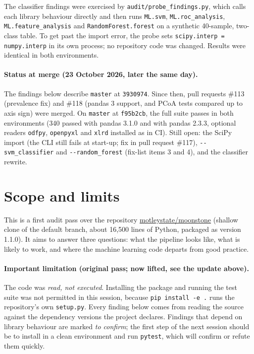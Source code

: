 \documentclass[11pt,a4paper]{article}
\newcommand{\code}[1]{\texttt{\small #1}}
\begin{document}
The classifier findings were exercised by \code{audit/probe\_findings.py}, which calls each library behaviour directly
and then runs \code{ML.svm}, \code{ML.roc\_analysis}, \code{ML.feature\_analysis} and \code{RandomForest.forest} on a
synthetic 40-sample, two-class table. To get past the import error, the probe sets \code{scipy.interp = numpy.interp}
in its own process; no repository code was changed. Results were identical in both environments.

\paragraph{Status at merge (23 October 2026, later the same day).} The findings below describe \code{master} at
\code{3930974}. Since then, pull requests \#113 (prevalence fix) and \#118 (pandas 3 support, and PCoA tests compared up to
axis sign) were merged. On \code{master} at \code{f95b2cb}, the full suite passes in both environments
(340 passed with pandas 3.1.0 and with pandas 2.3.3, optional readers \code{odfpy}, \code{openpyxl} and \code{xlrd}
installed as in CI). Still open: the SciPy import (the CLI still fails at start-up; fix in pull request \#117),
\code{-{}-svm\_classifier} and \code{-{}-random\_forest} (fix-list items 3 and 4), and the classifier rewrite.

\section*{Scope and limits}

This is a first audit pass over the repository \href{https://github.com/motleystate/moonstone}{motleystate/moonstone}
(shallow clone of the default branch, about 16,500 lines of Python, packaged as version 1.1.0).
It aims to answer three questions: what the pipeline looks like, what is likely to work, and where the
machine learning code departs from good practice.

\paragraph{Important limitation (original pass; now lifted, see the update above).} The code was \emph{read, not executed}. Installing the package and running the test
suite was not permitted in this session, because \code{pip install -e .} runs the repository's own
\code{setup.py}. Every finding below comes from reading the source against the dependency versions the project
declares. Findings that depend on library behaviour are marked \emph{to confirm}; the first step of the next session
should be to install in a clean environment and run \code{pytest}, which will confirm or refute them quickly.
\end{document}
